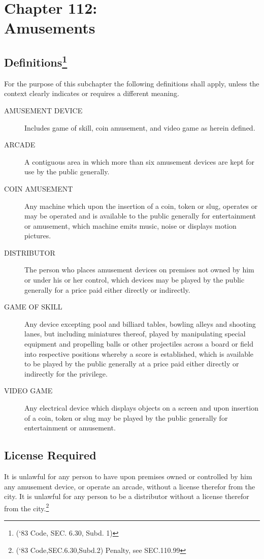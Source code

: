 \chapter*{Chapter 112: \\
	Amusements}
    \vfill
    \minitoc
    \pagebreak


\section{Definitions\footnote{(‘83 Code, SEC. 6.30, Subd. 1)}}
For the purpose of this subchapter the following definitions shall apply, unless the context clearly indicates or requires a different meaning.
\begin{description}
    \item[AMUSEMENT DEVICE] Includes game of skill, coin amusement, and video game as herein defined.
    \item[ARCADE] A contiguous area in which more than six amusement devices are kept for use by the public generally.
    \item[COIN AMUSEMENT] Any machine which upon the insertion of a coin, token or slug, operates or may be operated and is available to the public generally for entertainment or amusement, which machine emits music, noise or displays motion pictures.
    \item[DISTRIBUTOR] The person who places amusement devices on premises not owned by him or under his or her control, which devices may be played by the public generally for a price paid either directly or indirectly.
    \item[GAME OF SKILL] Any device excepting pool and billiard tables, bowling alleys and shooting lanes, but including miniatures thereof, played by manipulating special equipment and propelling balls or other projectiles across a board or field into respective positions whereby a score is established, which is available to be played by the public generally at a price paid either directly or indirectly for the privilege.
    \item[VIDEO GAME] Any electrical device which displays objects on a screen and upon insertion of a coin, token or slug may be played by the public generally for entertainment or amusement.
\end{description}

\section{License Required}
It is unlawful for any person to have upon premises owned or controlled by him any amusement device, or operate an arcade, without a license therefor from the city. It is unlawful for any person to be a distributor without a license therefor from the city.\footnote{(‘83 Code,SEC.6.30,Subd.2) Penalty, see SEC.110.99}

